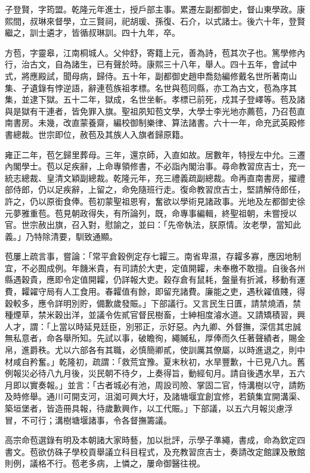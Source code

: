 \begin{pinyinscope}
子登賢，字筠盟。乾隆元年進士，授戶部主事。累遷左副都御史，督山東學政。康熙間，叔琳來督學，立三賢祠，祀胡瑗、孫復、石介，以式諸士。後六十年，登賢繼之，訓士遴才，皆循叔琳訓。四十九年，卒。

方苞，字靈皋，江南桐城人。父仲舒，寄籍上元，善為詩，苞其次子也。篤學修內行，治古文，自為諸生，已有聲於時。康熙三十八年，舉人。四十五年，會試中式，將應殿試，聞母病，歸侍。五十年，副都御史趙申喬劾編修戴名世所著南山集、孑遺錄有悖逆語，辭連苞族祖孝標。名世與苞同縣，亦工為古文，苞為序其集，並逮下獄。五十二年，獄成，名世坐斬。孝標已前死，戍其子登嶧等。苞及諸與是獄有干連者，皆免罪入旗。聖祖夙知苞文學，大學士李光地亦薦苞，乃召苞直南書房。未幾，改直蒙養齋，編校御制樂律、算法諸書。六十一年，命充武英殿修書總裁。世宗即位，赦苞及其族人入旗者歸原籍。

雍正二年，苞乞歸里葬母。三年，還京師，入直如故。居數年，特授左中允。三遷內閣學士。苞以足疾辭，上命專領修書，不必詣內閣治事。尋命教習庶吉士，充一統志總裁、皇清文穎副總裁。乾隆元年，充三禮義疏副總裁。命再直南書房，擢禮部侍郎，仍以足疾辭，上留之，命免隨班行走。復命教習庶吉士，堅請解侍郎任，許之，仍以原銜食俸。苞初蒙聖祖恩宥，奮欲以學術見諸政事。光地及左都御史徐元夢雅重苞。苞見朝政得失，有所論列，既，命專事編輯，終聖祖朝，未嘗授以官。世宗赦出旗，召入對，慰諭之，並曰：「先帝執法，朕原情。汝老學，當知此義。」乃特除清要，馴致通顯。

苞屢上疏言事，嘗論：「常平倉穀例定存七糶三。南省卑濕，存糶多寡，應因地制宜，不必囿成例。年饑米貴，有司請於大吏，定值開糶，未奉檄不敢擅。自後各州縣遇穀貴，應即令定值開糶，仍詳報大吏。穀存倉有鼠耗，盤量有折減，移動有運費，糶糴守局有人工食用。春糶值有餘，即留充諸費。廉能之吏，遇秋糴值賤，得穀較多，應令詳明別貯，備歉歲發賑。」下部議行。又言民生日匱，請禁燒酒，禁種煙草，禁米穀出洋，並議令佐貳官督民樹畜，士紳相度濬水道。又請矯積習，興人才，謂：「上當以時延見廷臣，別邪正，示好惡。內九卿、外督撫，深信其忠誠無私意者，命各舉所知。先試以事，破瞻徇，繩贓私，厚俸而久任著聲績者，賜金帛，進爵秩。尤以六部各有其職，必慎簡卿貳，使訓厲其僚屬，以時進退之，則中材咸自矜奮。」乾隆初，疏謂：「救荒宜豫。夏末秋初，水旱豐歉，十已見八九。舊例報災必待八九月後，災民朝不待夕，上奏得旨，動經旬月。請自後遇水旱，五六月即以實奏報。」並言：「古者城必有池，周設司險、掌固二官，恃溝樹以守，請飭及時修舉。通川可開支河，沮洳可興大圩，及諸塘堰宜創宜修，若鎮集宜開溝渠、築垣堡者，皆造冊具報，待歲歉興作，以工代賑。」下部議，以五六月報災慮浮冒，不可行；溝樹塘堰諸事，令各督撫籌議。

高宗命苞選錄有明及本朝諸大家時藝，加以批評，示學子準繩，書成，命為欽定四書文。苞欲仿硃子學校貢舉議立科目程式，及充教習庶吉士，奏請改定館課及散館則例，議格不行。苞老多病，上憐之，屢命御醫往視。


\end{pinyinscope}
